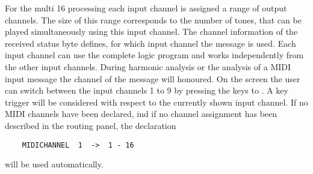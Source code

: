 For the multi 16 processing each input channel is assigned a range of
output channels. The size of this range corresponds to the number of
tones, that can be played simultaneously using this input channel. The
channel information of the received status byte defines, for which
input channel the message is used. Each input channel can use the
complete logic program and works independently from the other input
channels. During harmonic analysis or the analysis of a MIDI input
message the channel of the message will honoured. On the screen the
user can switch between the input channels 1 to 9 by pressing the keys
 to . A key trigger will be considered with
respect to the currently shown input channel. If no MIDI channels have
been declared, ind if no channel assignment has been described in the
routing panel, the declaration 
\begin{lstlisting}
	MIDICHANNEL  1  ->  1 - 16
\end{lstlisting}
will be used automatically.
\iffalse
Beim Multi-16-Verfahren wird
jedem Eingabekanal ein Bereich von MIDI-Out-Kanälen zugeordnet. Die Größe
dieses Bereichs entspricht der Anzahl Töne,
die mit diesem Eingabekanal gleichzeitig gespielt werden können.
Die Kanal-Information des empfangenen Statusbytes bestimmt, für
welchen Eingabekanal die Meldung gilt.
Jeder Eingabekanal hat für sich das gesamte Logik-Programm
zur Verfügung und arbeitet unabhängig von den anderen Eingabekanälen.
Bei der Analyse einer Harmonie und bei der Analyse einer MIDI-in-Nachricht
wird berücksichtigt, auf welchen Eingabekanal es sich bezieht.
Auf dem Bildschirm kann mit den Zifferntasten 1 bis 9 zwischen den
Eingabekanälen 1 bis 9 umgeschaltet werden. Ein Tasten-Auslöser
bezieht sich immer auf den am Bildschirm angezeigten Eingabekanal.
Falls keine MIDI-Kanäle deklariert werden, und auch keine Kanalzuordnung
in der Konfigurationsdatei angegeben ist,
gilt die Deklaration
\begin{lstlisting}
	MIDIKANAL  1  ->  1 - 16
\end{lstlisting}
als automatisch gegeben.
\fi



